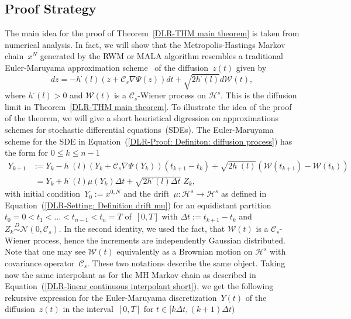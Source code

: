 \subsection{Proof Strategy}
\label{sec:sub:DLR-Proof strategy}


The main idea for the proof of Theorem~\ref{DLR-THM main theorem} is taken from numerical analysis. In fact, we will show that the Metropolis-Hastings Markov chain~$x^N$ generated by the RWM or MALA algorithm resembles a traditional Euler-Maruyama approximation scheme~\autocite{Kloeden1992} of the diffusion~$z(t)$ given by
 \begin{equation}
 \label{DLR-Proof: Definiton: diffusion process}
  dz = -h^{\cdot}(l) (z + \mathcal{C}_s \nabla \Psi(z)) dt + \sqrt{2 h^{\cdot}(l)} d\mathcal{W}(t),
 \end{equation}
where $h^{\cdot}(l) > 0$ and $\mathcal{W}(t)$ is a $\mathcal{C}_s$-Wiener process on $\mathcal{H}^s$. This is the diffusion limit in Theorem~\ref{DLR-THM main theorem}. To illustrate the idea of the proof of the theorem, we will give a short heuristical digression on approximations schemes for stochastic differential equations~(SDEs). The Euler-Maruyama scheme for the SDE in Equation~(\ref{DLR-Proof: Definiton: diffusion process}) has the form for $0 \leq k \leq n-1$
\begin{equation}
\label{DLR-Proof: Definition Euler-Maruyama scheme of limit SDE}
\begin{split}
  Y_{k+1} & := Y_k - h^{\cdot}(l) (Y_k + \mathcal{C}_s \nabla \Psi(Y_k)) (t_{k+1} - t_k) + \sqrt{2 h^{\cdot}(l)} (\mathcal{W}(t_{k+1}) - \mathcal{W}({t_k})) \\
  & \; = Y_k + h^{\cdot}(l) \mu(Y_k) \Delta t + \sqrt{2 h^{\cdot}(l) \Delta t} \; Z_k,
\end{split}
\end{equation}
with initial condition~$Y_0 := x^{0,N}$ and the drift~$\mu: \mathcal{H}^s \to \mathcal{H}^s$ as defined in Equation~(\ref{DLR-Setting: Definition drift mu}) for an equidistant partition~$t_0 =0 < t_1 < \dots < t_{n-1} < t_n = T $ of~$[0,T]$ with $\Delta t := t_{k+1} - t_k$ and $Z_k \stackrel{D}{\sim} \mathcal{N}(0, \mathcal{C}_s)$. In the second identity, we used the fact, that $\mathcal{W}(t)$ is a $\mathcal{C}_s$-Wiener process, hence the increments are independently Gaussian distributed. Note that one may see $\mathcal{W}(t)$ equivalently as a Brownian motion on $\mathcal{H}^s$ with covariance operator~$\mathcal{C}_s$. These two notations describe the same object. Taking now the same interpolant as for the MH Markov chain as described in Equation~(\ref{DLR-linear continuous interpolant short}), we get the following rekursive expression for the Euler-Maruyama discretization~$Y(t)$ of the diffusion~$z(t)$ in the interval~$[0,T]$ for $t \in [k \Delta t, (k+1) \Delta t)$
